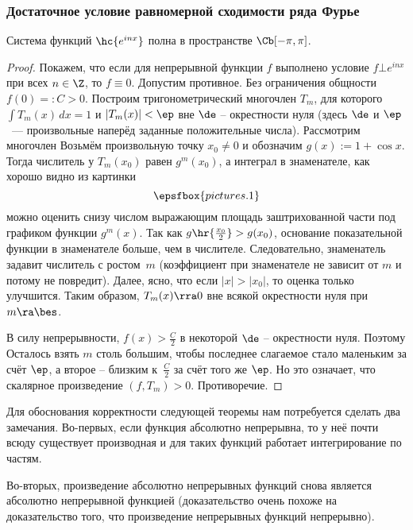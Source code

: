 \documentclass[a4paper]{article}
\newcommand{\dx}{\,dx}
\begin{document}
\subsubsection{Достаточное условие равномерной сходимости ряда Фурье}

\begin{stm}
Система функций $\hc{e^{inx}}$ полна в пространстве $\Cb[-\pi,\pi]$.
\end{stm}
\begin{proof}
Покажем, что если для непрерывной функции $f$ выполнено условие $f \bot e^{inx}$ при всех $n \in \Z$,
то $f \equiv 0$. Допустим противное. Без ограничения общности $f(0) =: C > 0$. Построим тригонометрический
многочлен $T_m$, для которого $\int T_m(x)\dx  = 1$ и $|T_m(x)| < \ep$ вне $\de$ -- окрестности нуля
(здесь $\de$ и $\ep$~--- произвольные наперёд заданные положительные числа). Рассмотрим многочлен
\eqn{T_m(x) := \frac{(1 + \cos x)^m}{\int (1+ \cos x)^m\dx}.}
Возьмём произвольную точку $x_0 \neq 0$ и обозначим $g(x) := 1 + \cos x$.
Тогда числитель у $T_m(x_0)$ равен $g^m(x_0)$, а интеграл в знаменателе, как хорошо видно из картинки
$$\epsfbox{pictures.1}$$
можно оценить снизу числом
выражающим площадь заштрихованной части под графиком функции $g^m(x)$.
Так как $g\hr{\frac{x_0}{2}} > g(x_0)$, основание показательной функции в знаменателе больше,
чем в числителе. Следовательно, знаменатель задавит числитель с ростом~$m$ (коэффициент
при знаменателе не зависит от $m$ и потому не повредит). Далее, ясно, что если
$|x| > |x_0|$, то оценка только улучшится. Таким образом, $T_m(x) \rra 0$ вне всякой
окрестности нуля при $m \ra \bes$.

В силу непрерывности, $f(x) > \frac{C}{2}$ в некоторой $\de$ -- окрестности нуля. Поэтому
\eqn{\int f(x) T_m(x)\dx \ge (1-\al)\cdot \frac{C}{2} - \al\cdot \hn{f}_\Cb, \quad \al := 2\ep(\pi-\de).}
Осталось взять $m$ столь большим, чтобы последнее слагаемое стало маленьким
за счёт $\ep$, а второе -- близким к~$\frac C2$ за счёт того же $\ep$.
Но это означает, что скалярное произведение $(f, T_m) > 0$. Противоречие.
\end{proof}

Для обоснования корректности следующей теоремы нам потребуется сделать два замечания.
Во-первых, если функция абсолютно непрерывна, то у неё почти всюду существует производная
и для таких функций работает интегрирование по частям.

Во-вторых, произведение абсолютно непрерывных функций снова является абсолютно непрерывной
функцией (доказательство очень похоже на доказательство того, что произведение непрерывных функций
непрерывно).
\end{document}

